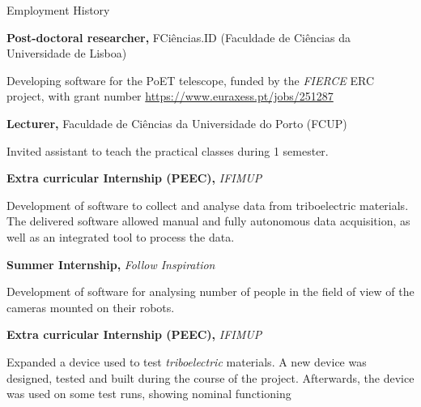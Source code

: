 \begin{rubric}{Employment History}

%
%
	\textbf{Post-doctoral researcher,} FCiências.ID (Faculdade de Ciências da Universidade de Lisboa)
	\par Developing software for the PoET telescope, funded by the \textit{FIERCE} ERC project, with grant number \href{101052347}{https://www.euraxess.pt/jobs/251287}
%

%
	\textbf{Lecturer,} Faculdade de Ciências da Universidade do Porto (FCUP)
	\par Invited assistant to teach the practical classes during 1 semester.
%

\entry*[\dates{2017-02/2017-08}]
	\textbf{Extra curricular Internship (PEEC),} \textit{IFIMUP}
	\par Development of software to collect and analyse data from triboelectric materials. The delivered software allowed manual and fully autonomous data acquisition, as well as an integrated tool to process the data.

\entry*[\dates{2017-07/2017-09}]
	\textbf{Summer Internship,} \textit{Follow Inspiration}
	\par Development of software for analysing number of people in the field of view of the cameras mounted on their robots.

\entry*[\dates{2016-02/2016-08}]
	\textbf{Extra curricular Internship (PEEC),} \textit{IFIMUP}
	\par Expanded a device used to test \textit{triboelectric} materials. A new device was designed, tested and built during the course of the project. Afterwards, the device was used on some test runs, showing nominal functioning
\end{rubric}






